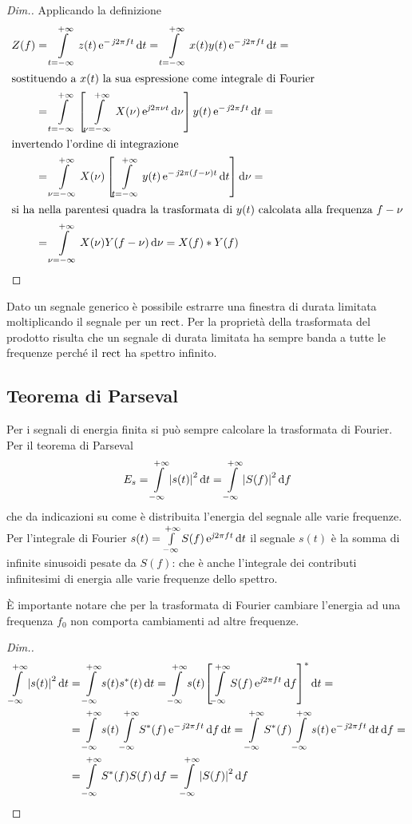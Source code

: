 \begin{proof}[Dim.] Applicando la definizione
\[\begin{split}Z(f)&=\intd{t=-\infty}{+\infty}{z(t)\e{-\imath 2\pi f t}}{t}=\intd{t=-\infty}{+\infty}{x(t)y(t)\e{-\imath 2\pi f t}}{t}=\\
\intertext{sostituendo a $x(t)$ la sua espressione come integrale di Fourier}
&=\intd{t=-\infty}{+\infty}{\left[\intd{\nu=-\infty}{+\infty}{X(\nu)\e{\imath 2\pi\nu t}}{\nu}\right]y(t)\e{-\imath 2\pi f t}}{t}=\\
\intertext{invertendo l'ordine di integrazione}
&=\intd{\nu=-\infty}{+\infty}{X(\nu)\left[\intd{t=-\infty}{+\infty}{y(t)\e{-\imath 2\pi(f-\nu)t}}{t}\right]}{\nu}=\\
\intertext{si ha nella parentesi quadra la trasformata di $y(t)$ calcolata alla frequenza $f-\nu$}
&=\intd{\nu=-\infty}{+\infty}{X(\nu)Y(f-\nu)}{\nu} = X(f)\ast Y(f)
\end{split}\]
\end{proof}

\begin{nota}
Dato un segnale generico è possibile estrarre una finestra di durata limitata moltiplicando il segnale per un $\operatorname{rect}$. Per la proprietà della trasformata del prodotto risulta che un segnale di durata limitata ha sempre banda a tutte le frequenze perché il $\operatorname{rect}$ ha spettro infinito. 
\end{nota}

\subsection{Teorema di Parseval}
Per i segnali di energia finita si può sempre calcolare la trasformata di Fourier. Per il teorema di Parseval
\begin{equation}E_s=\int\limits_{-\infty}^{+\infty}{\left|{s(t)}\right|^2}{\,\mathop{}\!\mathrm{d}{t}}=\int\limits_{-\infty}^{+\infty}{\left|{S(f)}\right|^2}{\,\mathop{}\!\mathrm{d}{f}}\label{eq:parseval}\end{equation}
che da indicazioni su come è distribuita l'energia del segnale alle varie frequenze. Per l'integrale di Fourier $s(t)=\int\limits_{-\infty}^{+\infty}{S(f)\operatorname{e}^{\operatorname{\mathit{j}\!} 2\pi f t}}{\,\mathop{}\!\mathrm{d}{t}}$ il segnale $s(t)$ è la somma di infinite sinusoidi pesate da $S(f)$: che è anche l'integrale dei contributi infinitesimi di energia alle varie frequenze dello spettro.
\begin{nota}\`{E} importante notare che per la trasformata di Fourier cambiare l'energia ad una frequenza $f_0$ non comporta cambiamenti ad altre frequenze.\end{nota}
\begin{proof}[Dim.]
\[\begin{split}\intinf{\abs{s(t)}^2}{t}&=\intinf{s(t)\conj{s}(t)}{t}
=\intinf{s(t)\conj{\left[\intinf{S(f)\e{\imath 2\pi f t}}{f}\right]}}{t}=\\
&=\intinf{s(t)\intinf{\conj{S}(f)\e{-\imath 2\pi f t}}{f}}{t}=\intinf{\conj{S}(f)\intinf{s(t)\e{-\imath 2\pi f t}}{t}}{f}=\\
&=\intinf{\conj{S}(f)S(f)}{f}=\intinf{\abs{S(f)}^2}{f}\end{split}\]
\end{proof}

